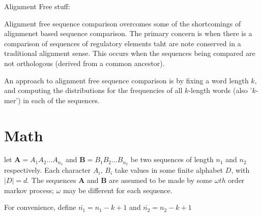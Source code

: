 Alignment Free stuff:

Alignment free sequence comparison overcomes some of the shortcomings of alignmenet based sequence comparison. The primary concern is when there is a comparison of sequences of regulatory elements taht are note conserved in a traditional alignment sense. This occurs when the sequences being compared are not orthologous (derived from a common ancestor). 

An approach to alignment free sequence comparison is by fixing a word length $k$, and computing the distributions for the frequencies of all $k$-length words (also '$k$-mer') in each of the sequences. 

\section{Math}

let $\mathbf{A} = A_1A_2\ldots A_{n_1}$ and $\mathbf{B}=B_1B_2\ldots B_{n_2}$ be two sequences of length $n_1$ and $n_2$ respectively. Each character $A_i,\,B_i$ take values in some finite alphabet $D$, with $|D| = d$.  The sequences $\mathbf{A}$ and $\mathbf{B}$ are assumed to be made by some $\omega th$ order markov process; $\omega$ may be different for each sequence. 

For convenience, define $\bar{n_1} = n_1 - k + 1$ and $\bar{n_2} = n_2 - k + 1$